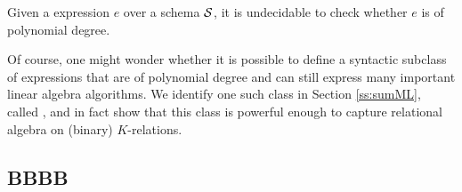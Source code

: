 \begin{proposition}
\label{prop-undec}
Given a \langfor expression $e$ over a schema $\mathcal{S}$, it is undecidable to check whether $e$ is of polynomial degree.
\end{proposition}



Of course, one might wonder whether it is possible to define a syntactic subclass of \langfor expressions that are of polynomial degree and can still express many important linear algebra algorithms. We identify one such class in Section \ref{ss:sumML}, called \langsum, and in fact show that this class is powerful enough to capture relational algebra on (binary) $K$-relations. 

\subsection{BBBB}
% 
%
%
%
